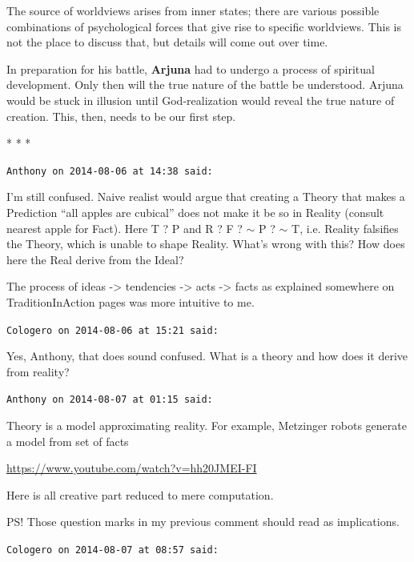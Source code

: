 The source of worldviews arises from inner states; there are various possible combinations of psychological forces that give rise to specific worldviews. This is not the place to discuss that, but details will come out over time.

In preparation for his battle, \textbf{Arjuna} had to undergo a process of spiritual development. Only then will the true nature of the battle be understood. Arjuna would be stuck in illusion until God-realization would reveal the true nature of creation. This, then, needs to be our first step.



\begin{center}* * *\end{center}

\begin{footnotesize}
\begin{sffamily}
\texttt{Anthony on 2014-08-06 at 14:38 said:}

I'm still confused. Naive realist would argue that creating a Theory that makes a Prediction ``all apples are cubical'' does not make it be so in Reality (consult nearest apple for Fact). Here T ? P and R ? F ? $\sim$ P ? $\sim$ T, i.e. Reality falsifies the Theory, which is unable to shape Reality. What's wrong with this? How does here the Real derive from the Ideal?

The process of ideas -> tendencies -> acts -> facts as explained somewhere on TraditionInAction pages was more intuitive to me.

\hfill

\texttt{Cologero on 2014-08-06 at 15:21 said:}

Yes, Anthony, that does sound confused. What is a theory and how does it derive from reality?

\hfill

\texttt{Anthony on 2014-08-07 at 01:15 said:}

Theory is a model approximating reality. For example, Metzinger robots generate a model from set of facts

\url{https://www.youtube.com/watch?v=hh20JMEI-FI}

Here is all creative part reduced to mere computation.

PS! Those question marks in my previous comment should read as implications.

\hfill

\texttt{Cologero on 2014-08-07 at 08:57 said:}


\end{sffamily}
\end{footnotesize}
